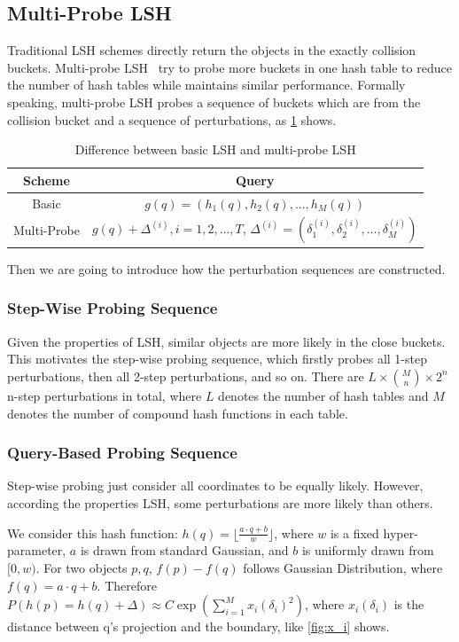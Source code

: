 \subsection{Multi-Probe LSH}
Traditional LSH schemes directly return the objects in the exactly collision buckets.
Multi-probe LSH~\cite{lv2007multi} try to probe more buckets in one hash table to reduce the number of hash tables while maintains similar performance.
Formally speaking, multi-probe LSH probes a sequence of buckets which are from the collision bucket and a sequence of perturbations, as \cref{tbl:multi-probe-lsh} shows.
\begin{table}[hbt]
\centering
\caption{Difference between basic LSH and multi-probe LSH}
\begin{tabular}{|c|c|}
\hline
  \textbf{Scheme} & \textbf{Query}\\ \hline
  Basic& $g(q)=(h_1(q), h_2(q), ..., h_M(q))$ \\ \hline
  Multi-Probe& $g(q){+}\Delta^{(i)}, i{=}1,2,...,T$, $\Delta^{(i)}{=}(\delta_1^{(i)}, \delta_2^{(i)}, ..., \delta_M^{(i)})$ \\ \hline
\end{tabular}
\label{tbl:multi-probe-lsh}
\end{table}

Then we are going to introduce how the perturbation sequences are constructed.
\subsubsection{Step-Wise Probing Sequence}
Given the properties of LSH, similar objects are more likely in the close buckets.
This motivates the step-wise probing sequence, which firstly probes all 1-step perturbations, then all 2-step perturbations, and so on.
There are $L{\times} {M\choose n} {\times} 2^{n}$ n-step perturbations in total, where $L$ denotes the number of hash tables and $M$ denotes the number of compound hash functions in each table.

\subsubsection{Query-Based Probing Sequence}
Step-wise probing just consider all coordinates to be equally likely.
However, according the properties LSH, some perturbations are more likely than others.

We consider this hash function: $h(q)=\lfloor\frac{a\cdot q + b}{w}\rfloor$, where $w$ is a fixed hyper-parameter, $a$ is drawn from standard Gaussian, and $b$ is uniformly drawn from $[0, w)$.
For two objects $p, q$, $f(p) - f(q)$ follows Gaussian Distribution, where $f(q){=}a\cdot q {+} b$.
Therefore $P(h(p)=h(q)+\Delta)\approx C \exp(\sum_{i=1}^{M} x_i(\delta_i)^2)$, where $x_i(\delta_i)$ is the distance between q's projection and the boundary, like \cref{fig:x_i} shows.

